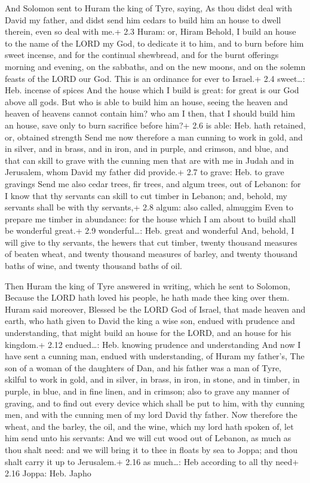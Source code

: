  And Solomon sent to Huram the king of Tyre, saying, As
thou didst deal with David my father, and didst send him cedars to build
him an house to dwell therein, even so deal with me.+ 2.3 Huram: or,
Hiram  Behold, I build an house to the name of the LORD my
God, to dedicate it to him, and to burn before him sweet incense, and
for the continual shewbread, and for the burnt offerings morning and
evening, on the sabbaths, and on the new moons, and on the solemn feasts
of the LORD our God. This is an ordinance for ever to Israel.+ 2.4
sweet\ldots: Heb. incense of spices  And the house which I
build is great: for great is our God above all gods.  But
who is able to build him an house, seeing the heaven and heaven of
heavens cannot contain him? who am I then, that I should build him an
house, save only to burn sacrifice before him?+ 2.6 is able: Heb. hath
retained, or, obtained strength  Send me now therefore a man
cunning to work in gold, and in silver, and in brass, and in iron, and
in purple, and crimson, and blue, and that can skill to grave with the
cunning men that are with me in Judah and in Jerusalem, whom David my
father did provide.+ 2.7 to grave: Heb. to grave gravings 
Send me also cedar trees, fir trees, and algum trees, out of Lebanon:
for I know that thy servants can skill to cut timber in Lebanon; and,
behold, my servants shall be with thy servants,+ 2.8 algum: also called,
almuggim  Even to prepare me timber in abundance: for the
house which I am about to build shall be wonderful great.+ 2.9
wonderful\ldots: Heb. great and wonderful  And, behold, I
will give to thy servants, the hewers that cut timber, twenty thousand
measures of beaten wheat, and twenty thousand measures of barley, and
twenty thousand baths of wine, and twenty thousand baths of oil.

 Then Huram the king of Tyre answered in writing, which
he sent to Solomon, Because the LORD hath loved his people, he hath made
thee king over them.  Huram said moreover, Blessed be the
LORD God of Israel, that made heaven and earth, who hath given to David
the king a wise son, endued with prudence and understanding, that might
build an house for the LORD, and an house for his kingdom.+ 2.12
endued\ldots: Heb. knowing prudence and understanding  And
now I have sent a cunning man, endued with understanding, of Huram my
father's,  The son of a woman of the daughters of Dan, and
his father was a man of Tyre, skilful to work in gold, and in silver, in
brass, in iron, in stone, and in timber, in purple, in blue, and in fine
linen, and in crimson; also to grave any manner of graving, and to find
out every device which shall be put to him, with thy cunning men, and
with the cunning men of my lord David thy father.  Now
therefore the wheat, and the barley, the oil, and the wine, which my
lord hath spoken of, let him send unto his servants:  And
we will cut wood out of Lebanon, as much as thou shalt need: and we will
bring it to thee in floats by sea to Joppa; and thou shalt carry it up
to Jerusalem.+ 2.16 as much\ldots: Heb according to all thy need+ 2.16
Joppa: Heb. Japho

